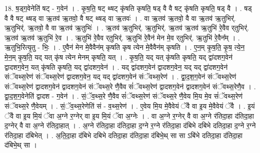 \documentclass[17pt]{extarticle}
\begin{document}
18. ष॒ड्ग॒वेनेति॑ षट् - ग॒वेन॑ । . कृ॒ष॒ति॒ षट् थ्षट् कृ॑षति कृषति॒ षड् वै वै षट् कृ॑षति कृषति॒ षड् वै । . षड् वै वै षट् थ्षड् वा ऋ॒तव॑ ऋ॒तवो॒ वै षट् थ्षड् वा ऋ॒तवः॑ । . वा ऋ॒तव॑ ऋ॒तवो॒ वै वा ऋ॒तव॑ ऋ॒तुभिर्॑. ऋ॒तुभिर्॑. ऋ॒तवो॒ वै वा ऋ॒तव॑ ऋ॒तुभिः॑ । . ऋ॒तव॑ ऋ॒तुभिर्॑. ऋ॒तुभिर्॑. ऋ॒तव॑ ऋ॒तव॑ ऋ॒तुभि॑ रे॒वैव र्‌तुभिर्॑. ऋ॒तव॑ ऋ॒तव॑ ऋ॒तुभि॑ रे॒व । . ऋ॒तुभि॑ रे॒वैव र्‌तुभिर्॑. ऋ॒तुभि॑ रे॒वैन॑ मेन मे॒व र्‌तुभिर्॑. ऋ॒तुभि॑ रे॒वैन᳚म् । . ऋ॒तुभि॒रित्यृ॒तु - भिः॒ । . ए॒वैन॑ मेन मे॒वैवैन॑म् कृषति कृष त्येन मे॒वैवैन॑म् कृषति । . ए॒न॒म् कृ॒ष॒ति॒ कृ॒ष॒ त्ये॒न॒ मे॒न॒म् कृ॒ष॒ति॒ यद् यत् कृ॑ष त्येन मेनम् कृषति॒ यत् । . कृ॒ष॒ति॒ यद् यत् कृ॑षति कृषति॒ यद् द्वा॑दशग॒वेन॑ द्वादशग॒वेन॒ यत् कृ॑षति कृषति॒ यद् द्वा॑दशग॒वेन॑ । . यद् द्वा॑दशग॒वेन॑ द्वादशग॒वेन॒ यद् यद् द्वा॑दशग॒वेन॑ संॅवथ्स॒रेण॑ संॅवथ्स॒रेण॑ द्वादशग॒वेन॒ यद् यद् द्वा॑दशग॒वेन॑ संॅवथ्स॒रेण॑ । . द्वा॒द॒श॒ग॒वेन॑ संॅवथ्स॒रेण॑ संॅवथ्स॒रेण॑ द्वादशग॒वेन॑ द्वादशग॒वेन॑ संॅवथ्स॒रे णै॒वैव सं॑ॅवथ्स॒रेण॑ द्वादशग॒वेन॑ द्वादशग॒वेन॑ संॅवथ्स॒रेणै॒व । . द्वा॒द॒श॒ग॒वेनेति॑ द्वादश - ग॒वेन॑ । . सं॒ॅव॒थ्स॒रे णै॒वैव सं॑ॅवथ्स॒रेण॑ संॅवथ्स॒रे णै॒वेय मि॒य मे॒व सं॑ॅवथ्स॒रेण॑ संॅवथ्स॒रे णै॒वेयम् । . सं॒ॅव॒थ्स॒रेणेति॑ सं - व॒थ्स॒रेण॑ । . ए॒वेय मि॒य मे॒वैवेयं ॅवै वा इ॒य मे॒वैवेयं ॅवै । . इ॒यं ॅवै वा इ॒य मि॒यं ॅवा अ॒ग्ने र॒ग्नेर् वा इ॒य मि॒यं ॅवा अ॒ग्नेः । . वा अ॒ग्ने र॒ग्नेर् वै वा अ॒ग्ने र॑तिदा॒हा द॑तिदा॒हा द॒ग्नेर् वै वा अ॒ग्ने र॑तिदा॒हात् । . अ॒ग्ने र॑तिदा॒हा द॑तिदा॒हा द॒ग्ने र॒ग्ने र॑तिदा॒हा द॑बिभे दबिभे दतिदा॒हा द॒ग्ने र॒ग्ने र॑तिदा॒हा द॑बिभेत् । . अ॒ति॒दा॒हा द॑बिभे दबिभे दतिदा॒हा द॑तिदा॒हा द॑बिभे॒थ् सा सा ऽबि॑भे दतिदा॒हा द॑तिदा॒हा द॑बिभे॒थ् सा । \newline
\end{document}
